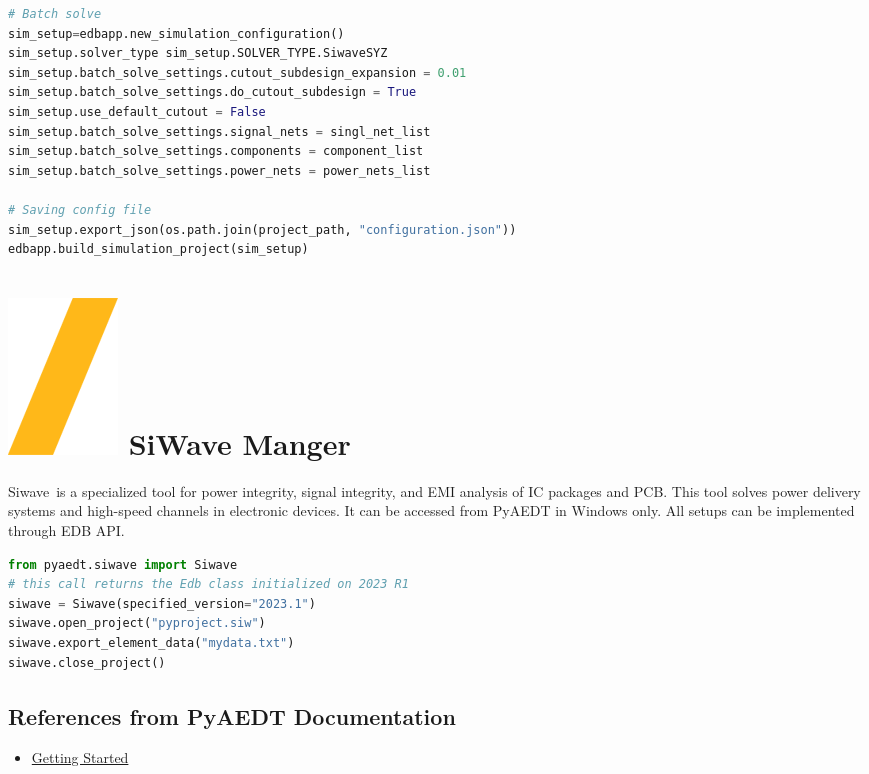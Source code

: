 \documentclass[landscape]{article}
\begin{document}
\begin{multicols}{3}
\begin{lstlisting}[language=Python]
# Batch solve
sim_setup=edbapp.new_simulation_configuration()
sim_setup.solver_type sim_setup.SOLVER_TYPE.SiwaveSYZ
sim_setup.batch_solve_settings.cutout_subdesign_expansion = 0.01
sim_setup.batch_solve_settings.do_cutout_subdesign = True
sim_setup.use_default_cutout = False
sim_setup.batch_solve_settings.signal_nets = singl_net_list
sim_setup.batch_solve_settings.components = component_list
sim_setup.batch_solve_settings.power_nets = power_nets_list

# Saving config file
sim_setup.export_json(os.path.join(project_path, "configuration.json"))
edbapp.build_simulation_project(sim_setup)
\end{lstlisting}
\section{\includegraphics[height=\fontcharht\font`\S]{slash.png} SiWave Manger}
Siwave is a specialized tool for power integrity, signal integrity, and EMI analysis of IC packages and PCB. This tool solves power delivery systems and high-speed channels in electronic devices. It can be accessed from PyAEDT in Windows only. All setups can be implemented through EDB API.
\begin{lstlisting}[language=Python]
from pyaedt.siwave import Siwave
# this call returns the Edb class initialized on 2023 R1
siwave = Siwave(specified_version="2023.1")
siwave.open_project("pyproject.siw")
siwave.export_element_data("mydata.txt")
siwave.close_project()
\end{lstlisting}


\subsection{References from PyAEDT Documentation}
\begin{itemize}
\item \href{https://aedt.docs.pyansys.com}{Getting Started}
\end{itemize}
\end{multicols}
\vspace{-0.15cm}
\noindent\makebox[\linewidth]{\rule{\paperwidth}{4pt}}
\end{document}

